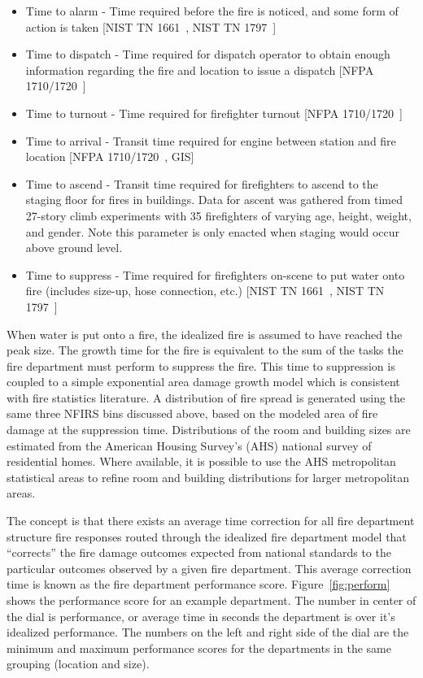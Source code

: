 \documentclass[12pt,oneside]{book}
\begin{document}
\begin{itemize}
\item Time to alarm - Time required before the fire is noticed, and some form of action is taken [NIST TN 1661~\cite{NIST:Residential}, NIST TN 1797~\cite{NIST:HighRise}]
\item Time to dispatch - Time required for dispatch operator to obtain enough information regarding the fire and location to issue a dispatch [NFPA 1710/1720~\cite{nfpa_1710,nfpa_1720}]
\item Time to turnout - Time required for firefighter turnout [NFPA 1710/1720~\cite{nfpa_1710,nfpa_1720}]
\item Time to arrival - Transit time required for engine between station and fire location [NFPA 1710/1720~\cite{nfpa_1710,nfpa_1720}, GIS]
\item Time to ascend - Transit time required for firefighters to ascend to the staging floor for fires in buildings. Data for ascent was gathered from timed 27-story climb experiments with 35 firefighters of varying age, height, weight, and gender. Note this parameter is only enacted when staging would occur above ground level.
\item Time to suppress - Time required for firefighters on-scene to put water onto fire (includes size-up, hose connection, etc.) [NIST TN 1661~\cite{NIST:Residential}, NIST TN 1797~\cite{NIST:HighRise}]
\end{itemize}

When water is put onto a fire, the idealized fire is assumed to have reached the peak size. The growth time for the fire is equivalent to the sum of the tasks the fire department must perform to suppress the fire. This time to suppression is coupled to a simple exponential area damage growth model which is consistent with fire statistics literature. A distribution of fire spread is generated using the same three NFIRS bins discussed above, based on the modeled area of fire damage at the suppression time. Distributions of the room and building sizes are estimated from the American Housing Survey's (AHS) national survey of residential homes. Where available, it is possible to use the AHS metropolitan statistical areas to refine room and building distributions for larger metropolitan areas.

The concept is that there exists an average time correction for all fire department structure fire responses routed through the idealized fire department model that ``corrects'' the fire damage outcomes expected from national standards to the particular outcomes observed by a given fire department. This average correction time is known as the fire department performance score. Figure~\ref{fig:perform} shows the performance score for an example department. The number in center of the dial is performance, or average time in seconds the department is over it's idealized performance. The numbers on the left and right side of the dial are the minimum and maximum performance scores for the departments in the same grouping (location and size).
\end{document}
